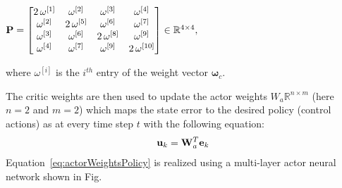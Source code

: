 \documentclass[conference]{IEEEtran}
\begin{document}
 \begin{center}
 ${\bf P}=\begin{bmatrix} 
 2\,\omega^{[1]}    & \omega^{[2]}      & \omega^{[3]}       & \omega^{[4]}        \\ 
 \omega^{[2]}       &2\, \omega^{[5]}   & \omega^{[6]}       & \omega^{[7]}        \\
 \omega^{[3]}       & \omega^{[6]}      &2\, \omega^{[8]}   & \omega^{[9]}   \\   
 \omega^{[4]}       & \omega^{[7]}      & \omega^{[9]}      & 2\,\omega^{[10]}      
 \end{bmatrix}\in \mathbb{R}^{4\times 4},$
 \end{center}
 where $\omega^{[i]}$ is the $i^{th}$ entry of the weight vector $\bm{\omega}_c.$ 

 The critic weights are then used to update the actor weights $W_a\mathbb{R}^{n\times m}$ (here $n=2$ and $m=2$) which maps the state error to the desired policy (control actions) as  at every time step $t$ with the following equation:
 \begin{align}
 \label{eq:actorWeightsPolicy}    
 \mathbf{u}_k  =  {\bf W}_a^T \mathbf{e}_k
 \end{align}
%
 Equation~\eqref{eq:actorWeightsPolicy} is realized using a multi-layer actor neural network shown in Fig.~
 
\end{document}
